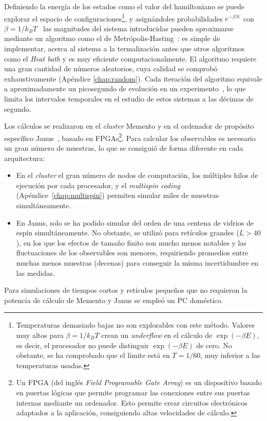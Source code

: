 \documentclass[11pt]{report}
\newcommand{\Ham}{\mathscr{H}}
\newcommand{\sub}[1]{ _{{\scriptscriptstyle \mathit{#1}}}  }
\newcommand{\kb}{k\sub{B}}
\begin{document}
Definiendo la energía de los estados como el valor del hamiltoniano se
puede explorar el espacio de configuraciones\footnote{ Temperaturas
  demasiado bajas no son explorables con este método. Valores muy
  altos para $β=1/\kb T$ crean un \textit{underflow} en el cálculo de
  $\exp(-βE)$, es decir, el procesador no puede distinguir $\exp(-βE)$
  de cero. No obstante, se ha comprobado que el límite está en
  $T=1/60$, muy inferior a las temperaturas usadas. }, y asignándoles
probabilidades $e^{-β \Ham}$ con $β=1/\kb T$ \  las magnitudes del
sistema introducidas pueden aproximarse mediante un algoritmo como el
de Metrópolis-Hasting~\cite{metropolis}: es simple de implementar,
acerca al sistema a la termalización antes que otros algoritmos como
el \textit{Heat bath} y es muy eficiente computacionalmente. El
algoritmo requiere una gran cantidad de números aleatorios, cuya
calidad se comprobó exhaustivamente (Apéndice \ref{chap:random}). Cada
iteración del algoritmo equivale a aproximadamente un picosegundo de
evolución en un experimento~\cite{tiempos}, lo que limita los
intervalos temporales en el estudio de estos sistemas a las décimas de
segundo.

Los cálculos se realizaron en el \textit{cluster} Memento y en el
ordenador de propósito específico Janus~\cite{janus}, basado en
FPGAs\footnote{Un FPGA (del inglés \textit{Field Programable Gate
    Array}) es un dispositivo basado en puertas lógicas que permite
  programar las conexiones entre sus puertas internas mediante un
  ordenador. Esto permite crear circuitos electrónicos adaptados a la
  aplicación, consiguiendo altas velocidades de cálculo.}. Para
calcular los observables es necesario un gran número de
muestras, lo que se consiguió de forma diferente en cada arquitectura:
\begin{itemize}
\item En el \textit{cluster} el gran número de nodos de computación,
  los múltiples hilos de ejecución por cada procesador, y el
  \textit{multispin coding}~\cite{onetruemultispincoding}
  (Apéndice~\ref{chap:multispin}) permiten simular miles de muestras
  simultáneamente.
\item En Janus, solo se ha podido simular del orden de una centena de
  vidrios de espín simultáneamente. No obstante, se utilizó para retículos
  grandes ($L>40$), en los que los efectos de tamaño finito son mucho
  menos notables y las fluctuaciones de los observables son menores,
  requiriendo promedios entre muchas menos muestras (decenas) para
  conseguir la misma incertidumbre en las medidas.
\end{itemize}
Para simulaciones de tiempos cortos y retículos pequeños que no
requieron la potencia de cálculo de Memento y Janus se empleó un PC
doméstico.
\end{document}

